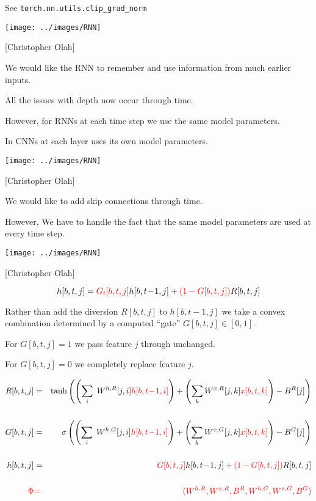 {\vfill
See {\tt torch.nn.utils.clip\_grad\_norm}


\centerline{\texttt{[image: ../images/RNN]}}
\centerline{{\large [Christopher Olah]}}

\vfill
We would like the RNN to {\color{red} remember and use} information from much earlier inputs.


\vfill
All the issues with depth now occur through time.

\vfill
However, for RNNs {\color{red} at each time step we use the same model parameters.}

\vfill
In CNNs {\color{red} at each layer uses its own model parameters.}


\centerline{\texttt{[image: ../images/RNN]}}
\centerline{{\large [Christopher Olah]}}

\vfill
We would like to add {\color{red} skip connections through time}.

\vfill
However, We have to handle the fact that the same model parameters are used at every time step.



\centerline{\texttt{[image: ../images/RNN]}}
\centerline{{\large [Christopher Olah]}}

$$h[b,t,j] =  {\color{red} G_t[b,t,j]}h[b,t\!-\!1,j] + {\color{red} (1-G[b,t,j])}R[b,t,j]$$

\vfill
Rather than add the diversion $R[b,t,j]$ to $h[b,t\!-\!1,j]$ we take a convex combination determined by a computed ``gate'' $G[b,t,j] \in [0,1]$.

\vfill
For $G[b,t,j] =1$ we pass feature $j$ through unchanged.

For $G[b,t,j] = 0$ we completely replace feature $j$.


{\huge
\begin{eqnarray*}
R[b,t,j] & = & \mathrm{tanh}\left(\left(\sum_i\;W^{h,R}[j,i]{\color{red} h[b,t\!-\!1,i]}\right) + \left(\sum_k W^{x,R}[j,k]{\color{red} x[b,t,k]}\right) - B^R[j]\right) \\
\\
G[b,t,j] & = & \sigma\left(\left(\sum_i\;W^{h,G}[j,i]{\color{red} h[b,t\!-\!1,i]}\right) + \left(\sum_k W^{x,G}[j,k]{\color{red} x[b,t,k]}\right) - B^G[j]\right) \\
\\
h[b,t,j] & = & {\color{red} G[b,t,j]}h[b,t\!-\!1,j] + {\color{red} (1-G[b,t,j])}R[b,t,j] \\
\\
{\color{red} \Phi} & {\color{red} =} & {\color{red} (W^{h,R},W^{x,R},B^R,W^{h,G},W^{x,G},B^G)}
\end{eqnarray*}
}

}
